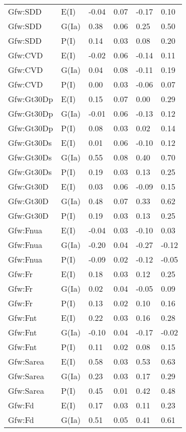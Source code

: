 \begin{center}
\begin{longtable}{|p{1.1in}|p{0.7in}|p{0.7in}|p{0.6in}|p{0.6in}|p{0.6in}|}
  Gfw:SDD & E(I) & -0.04 & 0.07 & -0.17 & 0.10 \\ 
  Gfw:SDD & G(Ia) & 0.38 & 0.06 & 0.25 & 0.50 \\ 
  Gfw:SDD & P(I) & 0.14 & 0.03 & 0.08 & 0.20 \\ 
  Gfw:CVD & E(I) & -0.02 & 0.06 & -0.14 & 0.11 \\ 
  Gfw:CVD & G(Ia) & 0.04 & 0.08 & -0.11 & 0.19 \\ 
  Gfw:CVD & P(I) & 0.00 & 0.03 & -0.06 & 0.07 \\ 
  Gfw:Gt30Dp & E(I) & 0.15 & 0.07 & 0.00 & 0.29 \\ 
  Gfw:Gt30Dp & G(Ia) & -0.01 & 0.06 & -0.13 & 0.12 \\ 
  Gfw:Gt30Dp & P(I) & 0.08 & 0.03 & 0.02 & 0.14 \\ 
  Gfw:Gt30Ds & E(I) & 0.01 & 0.06 & -0.10 & 0.12 \\ 
  Gfw:Gt30Ds & G(Ia) & 0.55 & 0.08 & 0.40 & 0.70 \\ 
  Gfw:Gt30Ds & P(I) & 0.19 & 0.03 & 0.13 & 0.25 \\ 
  Gfw:Gt30D & E(I) & 0.03 & 0.06 & -0.09 & 0.15 \\ 
  Gfw:Gt30D & G(Ia) & 0.48 & 0.07 & 0.33 & 0.62 \\ 
  Gfw:Gt30D & P(I) & 0.19 & 0.03 & 0.13 & 0.25 \\ 
  Gfw:Fnua & E(I) & -0.04 & 0.03 & -0.10 & 0.03 \\ 
  Gfw:Fnua & G(Ia) & -0.20 & 0.04 & -0.27 & -0.12 \\ 
  Gfw:Fnua & P(I) & -0.09 & 0.02 & -0.12 & -0.05 \\ 
  Gfw:Fr & E(I) & 0.18 & 0.03 & 0.12 & 0.25 \\ 
  Gfw:Fr & G(Ia) & 0.02 & 0.04 & -0.05 & 0.09 \\ 
  Gfw:Fr & P(I) & 0.13 & 0.02 & 0.10 & 0.16 \\ 
  Gfw:Fnt & E(I) & 0.22 & 0.03 & 0.16 & 0.28 \\ 
  Gfw:Fnt & G(Ia) & -0.10 & 0.04 & -0.17 & -0.02 \\ 
  Gfw:Fnt & P(I) & 0.11 & 0.02 & 0.08 & 0.15 \\ 
  Gfw:Sarea & E(I) & 0.58 & 0.03 & 0.53 & 0.63 \\ 
  Gfw:Sarea & G(Ia) & 0.23 & 0.03 & 0.17 & 0.29 \\ 
  Gfw:Sarea & P(I) & 0.45 & 0.01 & 0.42 & 0.48 \\ 
  Gfw:Fd & E(I) & 0.17 & 0.03 & 0.11 & 0.23 \\ 
  Gfw:Fd & G(Ia) & 0.51 & 0.05 & 0.41 & 0.61 \\ 

\end{longtable}
\end{center}
